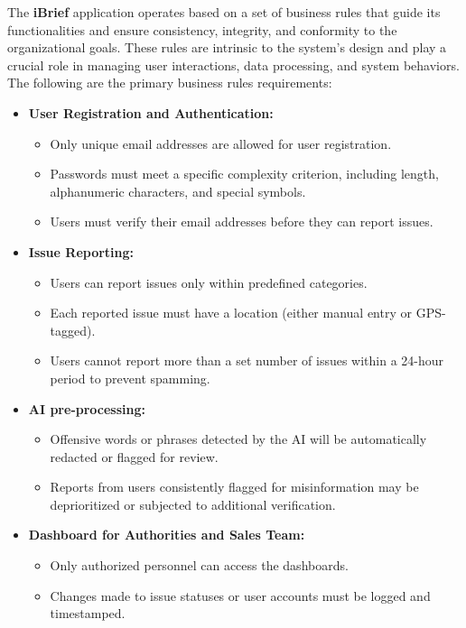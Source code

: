 The \textbf{iBrief} application operates based on a set of business rules that guide its functionalities and ensure consistency, integrity, and conformity to the organizational goals. These rules are intrinsic to the system's design and play a crucial role in managing user interactions, data processing, and system behaviors. The following are the primary business rules requirements:

\begin{itemize}
    \item \textbf{User Registration and Authentication:} 
    \begin{itemize}
        \item Only unique email addresses are allowed for user registration.
        \item Passwords must meet a specific complexity criterion, including length, alphanumeric characters, and special symbols.
        \item Users must verify their email addresses before they can report issues.
    \end{itemize}
    
    \item \textbf{Issue Reporting:} 
    \begin{itemize}
        \item Users can report issues only within predefined categories. 
        \item Each reported issue must have a location (either manual entry or \gls{GPS}-tagged).
        \item Users cannot report more than a set number of issues within a 24-hour period to prevent spamming.
    \end{itemize}
    
    \item \textbf{AI pre-processing:}
    \begin{itemize}
        \item Offensive words or phrases detected by the \gls{AI} will be automatically redacted or flagged for review.
        \item Reports from users consistently flagged for misinformation may be deprioritized or subjected to additional verification.
    \end{itemize}

    \item \textbf{Dashboard for Authorities and Sales Team:}
    \begin{itemize}
        \item Only authorized personnel can access the dashboards.
        \item Changes made to issue statuses or user accounts must be logged and timestamped.
    \end{itemize}


\end{itemize}
